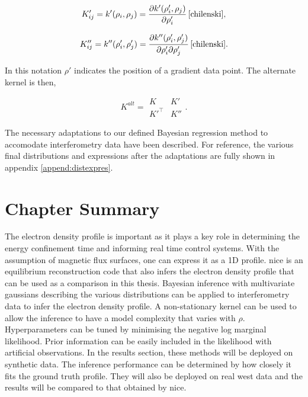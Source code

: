 \begin{equation}
  K'_{ij} = k'(\rho_i, \rho_j) = \frac{\partial k'(\rho'_i, \rho_j)}{\partial \rho'_i} \, \cite{chilenski},
\end{equation}

\begin{equation}
  K''_{ij} = k''(\rho'_i, \rho'_j) = \frac{\partial k''(\rho'_i, \rho'_j)}{\partial \rho'_i \partial \rho'_j} \, \cite{chilenski}.
\end{equation}

\noindent In this notation $\rho'$ indicates the position of a gradient data point. The alternate kernel is then,

\begin{equation}
  K^{alt} = 
    \begin{matrix}
      K & K'\\
      K'^{\top} & K''
    \end{matrix}.  
\end{equation}

The necessary adaptations to our defined Bayesian regression method to accomodate interferometry data have been described. For reference, the various final distributions and expressions after the adaptations are fully shown in appendix \ref{append:distexpres}.

\section{Chapter Summary}

The electron density profile is important as it plays a key role in determining the energy confinement time and informing real time control systems. With the assumption of magnetic flux surfaces, one can express it as a 1D profile. \gls{nice} is an equilibrium reconstruction code that also infers the electron density profile that can be used as a comparison in this thesis. Bayesian inference with multivariate gaussians describing the various distributions can be applied to interferometry data to infer the electron density profile. A non-stationary kernel can be used to allow the inference to have a model complexity that varies with $\rho$. Hyperparameters can be tuned by minimising the negative log marginal likelihood. Prior information can be easily included in the likelihood with artificial observations. In the results section, these methods will be deployed on synthetic data. The inference performance can be determined by how closely it fits the ground truth profile. They will also be deployed on real \gls{west} data and the results will be compared to that obtained by \gls{nice}.


